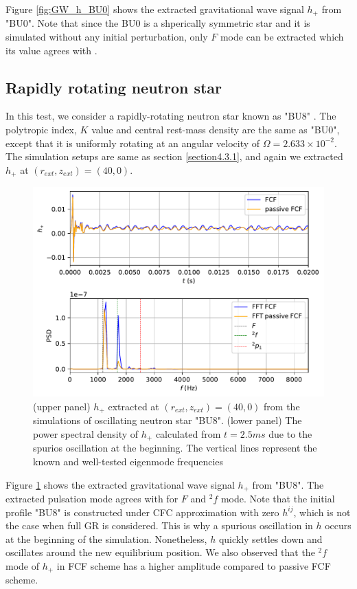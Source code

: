 Figure \ref{fig:GW_h_BU0} shows the extracted gravitational wave signal $h_{+}$ from "BU0".
Note that since the BU0 is a shperically symmetric star and it is simulated without any initial perturbation,
only $F$ mode can be extracted which its value agrees with \cite{dimmelmeier2006non}.

\subsection{Rapidly rotating neutron star}
\label{section4.3.2}
In this test, we consider a rapidly-rotating neutron star known as "BU8" \cite{dimmelmeier2006non}.
The polytropic index, $K$ value and central rest-mass density are the same as "BU0",
except that it is uniformly rotating at an angular velocity of $\Omega = 2.633 \times 10^{-2}$.
The simulation setups are same as section \ref{section4.3.1},
and again we extracted $h_{+}$ at $(r_{ext}, z_{ext}) = (40, 0)$.\\
\begin{figure}[h!]
\centering
  \includegraphics[width=\linewidth]{GW_combine_h_BU8.pdf}
\caption{(upper panel) $h_{+}$ extracted at $(r_{ext}, z_{ext}) = (40, 0)$ from the simulations of oscillating neutron star "BU8".
(lower panel) The power spectral density of $h_{+}$ calculated from $t=2.5ms$ due to the spurios oscillation at the beginning.
The vertical lines represent the known and well-tested eigenmode frequencies \cite{dimmelmeier2006non}}
\label{fig:GW_h_BU8}
\end{figure}
Figure \ref{fig:GW_h_BU8} shows the extracted gravitational wave signal $h_{+}$ from "BU8".
The extracted pulsation mode agrees with \cite{dimmelmeier2006non} for $F$ and ${}^2f$ mode.
Note that the initial profile "BU8" is constructed under CFC approximation with zero $h^{ij}$,
which is not the case when full GR is considered.
This is why a spurious oscillation in $h$ occurs at the beginning of the simulation.
Nonetheless, $h$ quickly settles down and oscillates around the new equilibrium position.
We also observed that the ${}^2f$ mode of $h_+$ in FCF scheme has a higher amplitude compared to passive FCF scheme.


